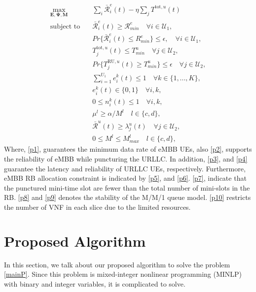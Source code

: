\documentclass[conference]{IEEEtran}
\begin{document}
\begin{subequations} \label{mainP}
\begin{alignat}{4}
\max\limits_{ \boldsymbol{E}, \boldsymbol{\Psi},\boldsymbol{M} } &  \sum_i \bar{\mathcal{R}}_{i}^e(t) - \eta \sum_j T^{\text{tot}, u}(t)       \ \\
\text{subject to} \quad  & \bar{\mathcal{R}}_{i}^e(t) \geq  \mathcal{R}_{min}^e \quad \forall i \in \mathcal{U}_1, \label{p1} \\
& Pr\{\bar{\mathcal{R}}_{i}^e(t) \leq {R}_{min}^e\}  \leq \epsilon,\quad \forall i \in \mathcal{U}_1, \label{p2}\\
&T^{\text{tot}, u}_j(t)  \leq T_{min}^u  \quad \forall j \in \mathcal{U}_2, \label{p3} \\
&Pr\{T^{\text{RU}, u}_j(t) \geq T_{min}^u\} \leq \epsilon  \quad \forall j \in \mathcal{U}_2, \label{p4} \\
&\sum_{i=1}^{U_1}e^k_i(t)\leq 1 \quad \forall k \in \{1,...,K\},\label{p5} \\
&e^k_i(t)\in \{0,1\}  \quad \forall i,k, \label{p6} \\
& 0 \leq n^k_i(t)\leq 1  \quad \forall i,k, \label{p7} \\
& \mu^l \geq \alpha/M^l \quad l \in \{c,d\},\label{p8} \\
& \bar{\mathcal{R}}^u(t) \geq {\lambda}_{j}^u(t) \quad \forall j \in \mathcal{U}_2,\label{p9} \\
& 0 \leq M^l \leq M_{max}^l  \quad l \in \{c,d\},\label{p10}
\end{alignat}
\label{constraints}
\end{subequations}
Where, \eqref{p1}, guarantees the minimum data rate of eMBB UEs, also
\eqref{p2}, supports the reliability of eMBB while puncturing the URLLC. 
In addition, \eqref{p3}, and \eqref{p4} guarantee the latency and reliability of URLLC UEs, respectively.
Furthermore, eMBB RB allocation constraint is indicated by \eqref{p5}, and \eqref{p6}.
\eqref{p7}, indicate that the punctured mini-time slot are fewer than the total number of mini-slots in the RB.
\eqref{p8} and \eqref{p9} denotes the stability of the M/M/1 queue model.
\eqref{p10} restricts the number of VNF in each slice due to the limited resources.

\section{Proposed Algorithm}
In this section, we talk about our proposed algorithm to solve the problem \eqref{mainP}.
Since this problem is mixed-integer nonlinear programming (MINLP) with binary and integer variables, it is complicated to solve.
\end{document}
